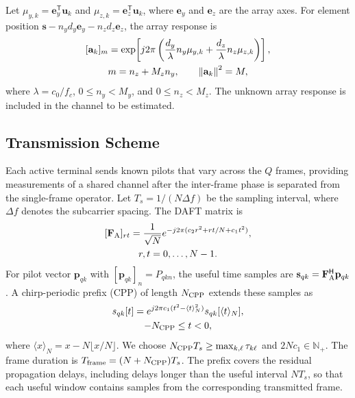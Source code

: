 Let $\mu_{y,k}=\mathbf e_y^{\mathsf T}\mathbf u_k$ and
$\mu_{z,k}=\mathbf e_z^{\mathsf T}\mathbf u_k$, where $\mathbf e_y$ and
$\mathbf e_z$ are the array axes. For element position
$\mathbf s-n_yd_y\mathbf e_y-n_zd_z\mathbf e_z$, the array response is
\begin{equation}
 \begin{gathered}
 [\mathbf{a}_k]_m=
 \exp\!\left[j2\pi\left(
 \frac{d_y}{\lambda}n_y\mu_{y,k}
 +\frac{d_z}{\lambda}n_z\mu_{z,k}\right)\right],\\
 m=n_z+M_zn_y,\qquad \norm{\mathbf{a}_k}^2=M,
 \end{gathered}
 \label{eq:upa}
\end{equation}
where $\lambda=c_0/f_c$, $0\leq n_y<M_y$, and $0\leq n_z<M_z$.
The unknown array response is included in the channel to be estimated.

\subsection{Transmission Scheme}

Each active terminal sends known pilots that vary across the $Q$
frames, providing measurements of a shared channel after the
inter-frame phase is separated from the single-frame operator.
Let $T_s=1/(N\Delta f)$ be the sampling interval, where $\Delta f$
denotes the subcarrier spacing. The DAFT matrix is \cite{bemani2022}
\begin{equation}
 \begin{gathered}
 [\mathbf{F}_{\rm A}]_{rt}=\frac{1}{\sqrt N}
 e^{-j2\pi(c_2r^2+rt/N+c_1t^2)},\\
 r,t=0,\ldots,N-1.
 \end{gathered}
 \label{eq:daft}
\end{equation}
For pilot vector $\mathbf p_{qk}$ with $[\mathbf p_{qk}]_n=P_{qkn}$,
the useful time samples are
$\mathbf s_{qk}=\mathbf F_{\rm A}^{\mathsf H}\mathbf p_{qk}$.
A chirp-periodic prefix (CPP) of length $N_{\rm CPP}$ extends these samples as
\begin{equation}
 \begin{gathered}
 s_{qk}[t]=e^{j2\pi c_1(t^2-\langle t\rangle_N^2)}
 s_{qk}[\langle t\rangle_N],\\
 -N_{\rm CPP}\leq t<0,
 \end{gathered}
 \label{eq:cpp}
\end{equation}
where $\langle x\rangle_N=x-N\lfloor x/N\rfloor$.
We choose $N_{\rm CPP}T_s\geq\max_{k,\ell}\tau_{k\ell}$ and
$2Nc_1\in\mathbb N_+$. The frame duration is
$T_{\rm frame}=(N+N_{\rm CPP})T_s$.
The prefix covers the residual propagation delays, including delays
longer than the useful interval $NT_s$, so that each useful window
contains samples from the corresponding transmitted frame.


